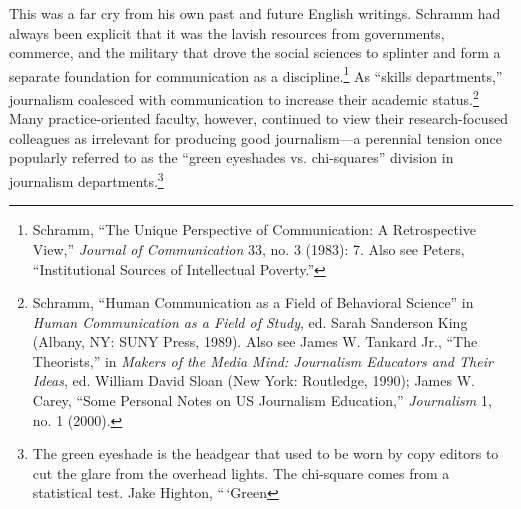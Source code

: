 \documentclass{tufte-handout}
\begin{document}
\begin{CJK*}{UTF8}{gbsn}
This was a far cry from his own past and future English writings.
Schramm had always been explicit that it was the lavish resources from
governments, commerce, and the military that drove the social sciences
to splinter and form a separate foundation for communication as a
discipline.\footnote{Schramm, ``The Unique Perspective of Communication:
  A Retrospective View,'' \emph{Journal of Communication} 33, no. 3
  (1983): 7. Also see Peters, ``Institutional Sources of Intellectual
  Poverty.''} As ``skills departments,'' journalism coalesced with
communication to increase their academic status.\footnote{Schramm,
  ``Human Communication as a Field of Behavioral Science'' in
  \emph{Human Communication as a Field of Study}, ed. Sarah Sanderson
  King (Albany, NY: SUNY Press, 1989). Also see James W. Tankard Jr.,
  ``The Theorists,'' in \emph{Makers of the Media Mind: Journalism
  Educators and Their Ideas}, ed. William David Sloan (New York:
  Routledge, 1990); James W. Carey, ``Some Personal Notes on US
  Journalism Education,'' \emph{Journalism} 1, no. 1 (2000).} Many
practice-oriented faculty, however, continued to view their
research-focused colleagues as irrelevant for producing good
journalism---a perennial tension once popularly referred to as the
``green eyeshades vs. chi-squares'' division in journalism
departments.\footnote{The green eyeshade is the headgear that used to be
  worn by copy editors to cut the glare from the overhead lights. The
  chi-square comes from a statistical test. Jake Highton, ``\,`Green
}
\end{CJK*}
\end{document}
